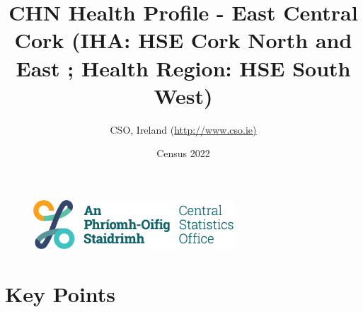 \documentclass{article}
\title{CHN Health Profile - East Central Cork (IHA: HSE Cork North and East ;  Health Region: HSE South West) }
\date{Census 2022}
\author{CSO, Ireland  (\url{http://www.cso.ie)}}
\begin{document}


\begin{figure}
	\centering
\includegraphics[width =75mm]{../figures/CSO_Logo.png}
\end{figure}

				 
		   
						  
														  
																																													
												 
			 
\maketitle
					
													   
				 
						 
																																																																											   
				 
				  
  \pagebreak
    	    \tableofcontents

\pagebreak


\section{Key Points}
\end{document}
